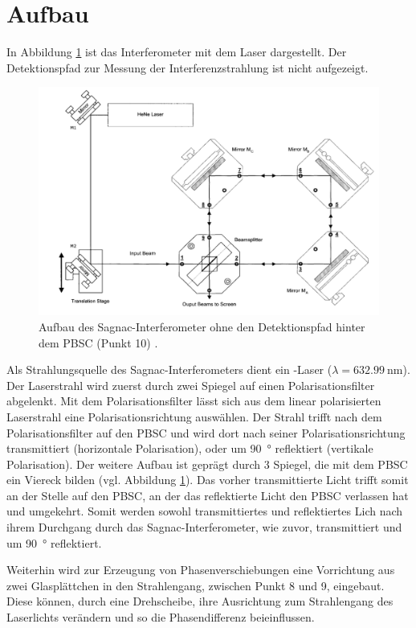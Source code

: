 \section{Aufbau}
In Abbildung \ref{fig:Aufbau} ist das Interferometer mit dem Laser dargestellt. Der Detektionspfad zur Messung der Interferenzstrahlung ist nicht aufgezeigt.
\begin{figure}
  \centering
  \includegraphics[width = .8\textwidth]{bilder/Aufbau.png}
  \caption{Aufbau des Sagnac-Interferometer ohne den Detektionspfad hinter dem PBSC (Punkt 10) \cite{anleitung}.}
  \label{fig:Aufbau}
\end{figure}
Als Strahlungsquelle des Sagnac-Interferometers dient ein -Laser ($\lambda = \SI{632.99}{\nano\meter}$).
Der Laserstrahl wird zuerst durch zwei Spiegel auf einen Polarisationsfilter abgelenkt.
Mit dem Polarisationsfilter lässt sich aus dem linear polarisierten Laserstrahl eine Polarisationsrichtung auswählen.
Der Strahl trifft nach dem Polarisationsfilter auf den PBSC und wird dort nach seiner Polarisationsrichtung transmittiert (horizontale Polarisation), oder um \SI{90}{\degree} reflektiert (vertikale Polarisation).
Der weitere Aufbau ist geprägt durch 3 Spiegel, die mit dem PBSC ein Viereck bilden (vgl. Abbildung \ref{fig:Aufbau}).
Das vorher transmittierte Licht trifft somit an der Stelle auf den PBSC, an der das reflektierte Licht den PBSC verlassen hat und umgekehrt.
Somit werden sowohl transmittiertes und reflektiertes Lich nach ihrem Durchgang durch das Sagnac-Interferometer, wie zuvor, transmittiert und um \SI{90}{\degree} reflektiert.
\par\medskip
Weiterhin wird zur Erzeugung von Phasenverschiebungen eine Vorrichtung aus zwei Glasplättchen in den Strahlengang, zwischen Punkt 8 und 9, eingebaut.
Diese können, durch eine Drehscheibe, ihre Ausrichtung zum Strahlengang des Laserlichts verändern und so die Phasendifferenz beieinflussen.
